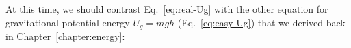 At this time, we should contrast Eq.~\ref{eq:real-Ug} with the other equation
for gravitational potential energy $U_g=mgh$ (Eq.~\ref{eq:easy-Ug}) that we
derived back in Chapter~\ref{chapter:energy}:
\begin{center}
\end{center}
